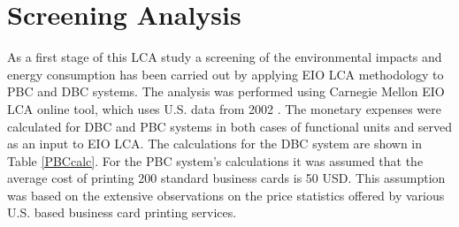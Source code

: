 \documentclass[conference]{IEEEtran}
\begin{document}

\section{Screening Analysis} \label{ScreeningLCA}

As a first stage of this LCA study a screening of the environmental impacts and energy consumption has been carried out by applying EIO LCA methodology to PBC and DBC systems. The analysis was performed using Carnegie Mellon EIO LCA online tool, which uses U.S. data from 2002 \cite{Mellon}. The monetary expenses were calculated for DBC and PBC systems in both cases of functional units and served as an input to EIO LCA. The calculations for the DBC system are shown in Table \ref{PBCcalc}. For the PBC system's calculations it was assumed that the average cost of printing 200 standard business cards is 50 USD. This assumption was based on the extensive observations on the price statistics offered by various U.S. based business card printing services.
\end{document}
